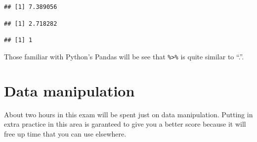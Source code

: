 \documentclass[]{book}
\newenvironment{Shaded}{\begin{snugshade}}{\end{snugshade}}
\newcommand{\DecValTok}[1]{\textcolor[rgb]{0.00,0.00,0.81}{#1}}
\newcommand{\KeywordTok}[1]{\textcolor[rgb]{0.13,0.29,0.53}{\textbf{#1}}}
\newcommand{\NormalTok}[1]{#1}
\newcommand{\OperatorTok}[1]{\textcolor[rgb]{0.81,0.36,0.00}{\textbf{#1}}}
\newcommand{\StringTok}[1]{\textcolor[rgb]{0.31,0.60,0.02}{#1}}
\begin{document}
\begin{verbatim}
## [1] 7.389056
\end{verbatim}

\begin{Shaded}
\end{Shaded}

\begin{verbatim}
## [1] 2.718282
\end{verbatim}

\begin{Shaded}
\end{Shaded}

\begin{verbatim}
## [1] 1
\end{verbatim}

Those familiar with Python's Pandas will be see that \texttt{\%\textgreater{}\%} is quite similar to ``.''.

\hypertarget{data-manipulation}{%
\chapter{Data manipulation}\label{data-manipulation}}

About two hours in this exam will be spent just on data manipulation. Putting in extra practice in this area is garanteed to give you a better score because it will free up time that you can use elsewhere.
\end{document}
